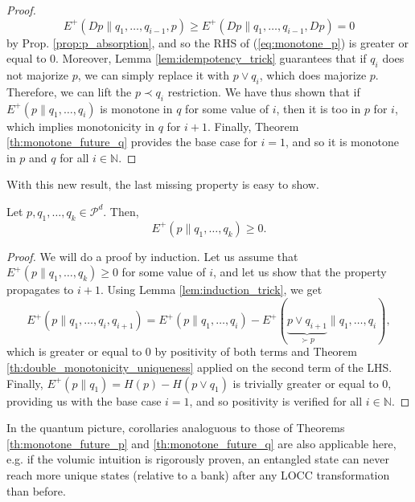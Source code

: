 \begin{proof}
    \begin{equation}
        E^+(Dp \parallel q_1, \dots, q_{i-1}, p) \geq E^+(Dp \parallel q_1, \dots, q_{i-1}, Dp) = 0
    \end{equation}
    by Prop. \ref{prop:p_absorption}, and so the RHS of (\ref{eq:monotone_p}) is greater or equal to 0. Moreover, Lemma \ref{lem:idempotency_trick} guarantees that if $q_i$ does not majorize $p$, we can simply replace it with $p \vee q_i$, which does majorize $p$. Therefore, we can lift the $p \prec q_i$ restriction. We have thus shown that if $E^+(p \parallel q_1, \dots, q_i)$ is monotone in $q$ for some value of $i$, then it is too in $p$ for $i$, which implies monotonicity in $q$ for $i+1$. Finally, Theorem \ref{th:monotone_future_q} provides the base case for $i = 1$, and so it is monotone in $p$ and $q$ for all $i \in \mathbb{N}$. \qedhere
\end{proof}

\noindent With this new result, the last missing property is easy to show.

\begin{theorem} \label{th:positivity_uniqueness}
    Let $p, q_1, \dots, q_k \in \mathcal{P}^d$. Then,
    \begin{equation}
        E^+(p \parallel q_1, \dots, q_k) \geq 0.
    \end{equation}
\end{theorem}

\begin{proof}
    We will do a proof by induction. Let us assume that $E^+(p \parallel q_1, \dots, q_k) \geq 0$ for some value of $i$, and let us show that the property propagates to $i+1$. Using Lemma \ref{lem:induction_trick}, we get
    \begin{equation}
        E^+(p \parallel q_1, \dots, q_i, q_{i+1}) = E^+(p \parallel q_1, \dots, q_i) - E^+(\underbrace{p \vee q_{i+1}}_{\succ p} \parallel q_1, \dots, q_i),
    \end{equation}
    which is greater or equal to 0 by positivity of both terms and Theorem \ref{th:double_monotonicity_uniqueness} applied on the second term of the LHS. Finally, $E^+(p \parallel q_1) = H(p) - H(p \vee q_1)$ is trivially greater or equal to 0, providing us with the base case $i = 1$, and so positivity is verified for all $i \in \mathbb{N}$. \qedhere
\end{proof}

In the quantum picture, corollaries analoguous to those of Theorems \ref{th:monotone_future_p} and \ref{th:monotone_future_q} are also applicable here, e.g. if the volumic intuition is rigorously proven, an entangled state can never reach more unique states (relative to a bank) after any LOCC transformation than before.



